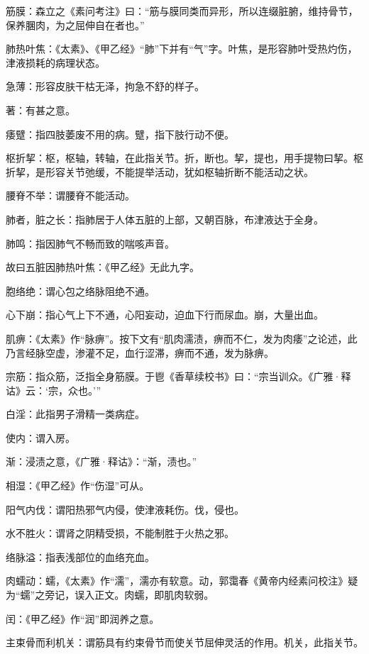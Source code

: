 \documentclass[draft,12pt]{ctexbook}
\begin{document}

\begin{jiaozhu}
  \item 筋膜：森立之《素问考注》曰：“筋与膜同类而异形，所以连缀脏腑，维持骨节，保养䐃肉，为之屈伸自在者也。”
  \item 肺热叶焦：《太素》、《甲乙经》“肺”下并有“气”字。叶焦，是形容肺叶受热灼伤，津液损耗的病理状态。
  \item 急薄：形容皮肤干枯无泽，拘急不舒的样子。
  \item 著：有甚之意。
  \item 痿躄：指四肢萎废不用的病。躄，指下肢行动不便。
  \item 枢折挈：枢，枢轴，转轴，在此指关节。折，断也。挈，提也，用手提物曰挈。枢折挈，是形容关节弛缓，不能提举活动，犹如枢轴折断不能活动之状。
  \item 腰脊不举：谓腰脊不能活动。
  \item 肺者，脏之长：指肺居于人体五脏的上部，又朝百脉，布津液达于全身。
  \item 肺鸣：指因肺气不畅而致的喘咳声音。
  \item 故曰五脏因肺热叶焦：《甲乙经》无此九字。
  \item 胞络绝：谓心包之络脉阻绝不通。
  \item 心下崩：指心气上下不通，心阳妄动，迫血下行而尿血。崩，大量出血。
  \item 肌痹：《太素》作“脉痹”。按下文有“肌肉濡渍，痹而不仁，发为肉痿”之论述，此乃言经脉空虚，渗灌不足，血行涩滞，痹而不通，发为脉痹。
  \item 宗筋：指众筋，泛指全身筋膜。于鬯《香草续校书》曰：“宗当训众。《广雅·释诂》云：‘宗，众也。’”
  \item 白淫：此指男子滑精一类病症。
  \item 使内：谓入房。
  \item 渐：浸渍之意，《广雅·释诂》：“渐，渍也。”
  \item 相湿：《甲乙经》作“伤湿”可从。
  \item 阳气内伐：谓阳热邪气内侵，使津液耗伤。伐，侵也。
  \item 水不胜火：谓肾之阴精受损，不能制胜于火热之邪。
  \item 络脉溢：指表浅部位的血络充血。
  \item 肉蠕动：蠕，《太素》作“濡”，濡亦有软意。动，郭霭春《黄帝内经素问校注》疑为“蠕”之旁记，误入正文。肉蠕，即肌肉软弱。
  \item 闰：《甲乙经》作“润”即润养之意。
  \item 主束骨而利机关：谓筋具有约束骨节而使关节屈伸灵活的作用。机关，此指关节。

\end{jiaozhu}
\end{document}
